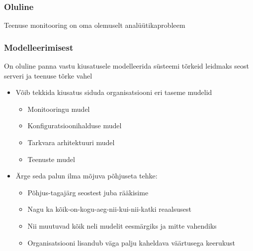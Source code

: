 \begin{frame}[fragile]
  \frametitle{Oluline}
	\begin{center}
		Teenuse monitooring on oma olemuselt analüütikaprobleem
	\end{center}
\end{frame}


\begin{frame}[fragile]
  \frametitle{Modelleerimisest}
	On oluline panna vastu kiusatusele modelleerida süsteemi tõrkeid leidmaks seost serveri ja teenuse tõrke vahel
		\begin{itemize}
			\item Võib tekkida kiusatus siduda organisatsiooni eri taseme mudelid
			\begin{itemize}
				\item Monitooringu mudel
				\item Konfiguratsioonihalduse mudel
				\item Tarkvara arhitektuuri mudel
				\item Teenuste mudel
			\end{itemize}
			\item Ärge seda palun ilma mõjuva põhjuseta tehke:
			\begin{itemize}
				\item Põhjus-tagajärg seostest juba rääkisime
				\item Nagu ka kõik-on-kogu-aeg-nii-kui-nii-katki reaalsusest
				\item Nii muutuvad kõik neli mudelit eesmärgiks ja mitte vahendiks
				\item Organisatsiooni lisandub väga palju kaheldava väärtusega keerukust
			\end{itemize}
			
		\end{itemize}		
\end{frame}

